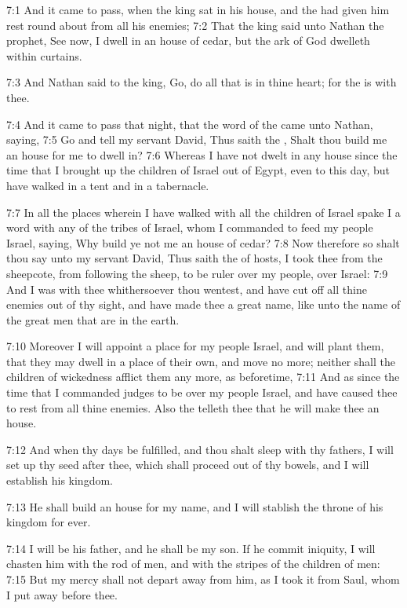 7:1 And it came to pass, when the king sat in his house, and the \LORD
had given him rest round about from all his enemies; 7:2 That the king
said unto Nathan the prophet, See now, I dwell in an house of cedar,
but the ark of God dwelleth within curtains.

7:3 And Nathan said to the king, Go, do all that is in thine heart;
for the \LORD is with thee.

7:4 And it came to pass that night, that the word of the \LORD came
unto Nathan, saying, 7:5 Go and tell my servant David, Thus saith the
\LORD, Shalt thou build me an house for me to dwell in?  7:6 Whereas I
have not dwelt in any house since the time that I brought up the
children of Israel out of Egypt, even to this day, but have walked in
a tent and in a tabernacle.

7:7 In all the places wherein I have walked with all the children of
Israel spake I a word with any of the tribes of Israel, whom I
commanded to feed my people Israel, saying, Why build ye not me an
house of cedar?  7:8 Now therefore so shalt thou say unto my servant
David, Thus saith the \LORD of hosts, I took thee from the sheepcote,
from following the sheep, to be ruler over my people, over Israel: 7:9
And I was with thee whithersoever thou wentest, and have cut off all
thine enemies out of thy sight, and have made thee a great name, like
unto the name of the great men that are in the earth.

7:10 Moreover I will appoint a place for my people Israel, and will
plant them, that they may dwell in a place of their own, and move no
more; neither shall the children of wickedness afflict them any more,
as beforetime, 7:11 And as since the time that I commanded judges to
be over my people Israel, and have caused thee to rest from all thine
enemies. Also the \LORD telleth thee that he will make thee an house.

7:12 And when thy days be fulfilled, and thou shalt sleep with thy
fathers, I will set up thy seed after thee, which shall proceed out of
thy bowels, and I will establish his kingdom.

7:13 He shall build an house for my name, and I will stablish the
throne of his kingdom for ever.

7:14 I will be his father, and he shall be my son. If he commit
iniquity, I will chasten him with the rod of men, and with the stripes
of the children of men: 7:15 But my mercy shall not depart away from
him, as I took it from Saul, whom I put away before thee.

